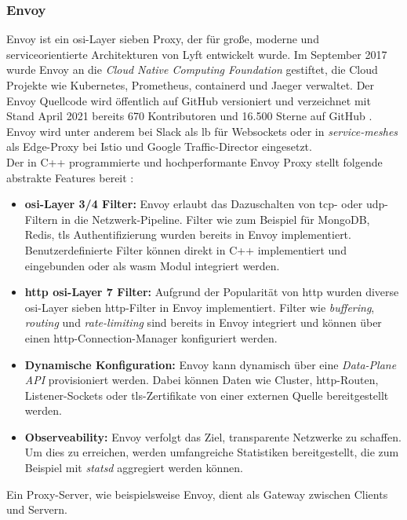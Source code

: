 \subsubsection{Envoy} \label{s:envoy}
Envoy ist ein \ac{osi}-Layer sieben Proxy, der für gro{\ss}e, moderne und serviceorientierte Architekturen von Lyft entwickelt wurde.
Im September 2017 wurde Envoy an die \textit{Cloud Native Computing Foundation} gestiftet, die Cloud Projekte wie Kubernetes, Prometheus, containerd und Jaeger verwaltet.
Der Envoy Quellcode wird öffentlich auf GitHub versioniert und verzeichnet mit Stand April 2021 bereits 670 Kontributoren und 16.500 Sterne auf GitHub \cite{EnvoyproxyEnvoy2021}.
Envoy wird unter anderem bei Slack \cite{MigratingMillionsConcurrent2021} als \acl{lb} für Websockets oder in \textit{service-meshes} als Edge-Proxy bei Istio \cite{Istio} und Google Traffic-Director \cite{TrafficDirectorGoogle} eingesetzt.
\\
Der in C++ programmierte und hochperformante Envoy Proxy stellt folgende abstrakte Features bereit \cite{WhatEnvoyEnvoy}:
\begin{itemize}
    \item \textbf{\acs{osi}-Layer 3/4 Filter:} Envoy erlaubt das Dazuschalten von \acs{tcp}- oder \acs{udp}-Filtern in die Netzwerk-Pipeline. Filter wie zum Beispiel für MongoDB, Redis, \ac{tls} Authentifizierung wurden bereits in Envoy implementiert. Benutzerdefinierte Filter können direkt in C++ implementiert und eingebunden oder als \ac{wasm} Modul integriert werden.
    \item \textbf{\acs{http} \ac{osi}-Layer 7 Filter:} Aufgrund der Popularität von \ac{http} wurden diverse \ac{osi}-Layer sieben \ac{http}-Filter in Envoy implementiert. Filter wie \textit{buffering}, \textit{routing} und \textit{rate-limiting} sind bereits in Envoy integriert und können über einen \ac{http}-Connection-Manager konfiguriert werden.
    \item \textbf{Dynamische Konfiguration:} Envoy kann dynamisch über eine \textit{Data-Plane API} provisioniert werden. Dabei können Daten wie Cluster, \ac{http}-Routen, Listener-Sockets oder \ac{tls}-Zertifikate von einer externen Quelle bereitgestellt werden.
    \item \textbf{Observeability:} Envoy verfolgt das Ziel, transparente Netzwerke zu schaffen. Um dies zu erreichen, werden umfangreiche Statistiken bereitgestellt, die zum Beispiel mit \textit{statsd} aggregiert werden können.
\end{itemize}
Ein Proxy-Server, wie beispielsweise Envoy, dient als Gateway zwischen Clients und Servern.
